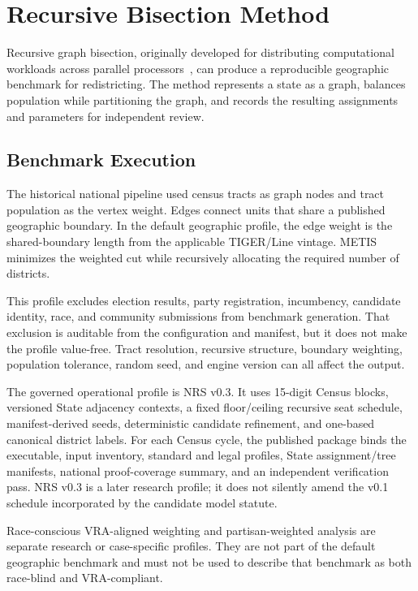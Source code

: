 \section{Recursive Bisection Method}

Recursive graph bisection, originally developed for distributing computational
workloads across parallel processors~\cite{karypis1998metis}, can produce a
reproducible geographic benchmark for redistricting. The method represents a
state as a graph, balances population while partitioning the graph, and records
the resulting assignments and parameters for independent review.

\subsection{Benchmark Execution}

The historical national pipeline used census tracts as graph nodes and tract
population as the vertex weight. Edges connect units that share a published
geographic boundary. In the default geographic profile, the edge weight is the
shared-boundary length from the applicable TIGER/Line vintage. METIS minimizes
the weighted cut while recursively allocating the required number of districts.

This profile excludes election results, party registration, incumbency,
candidate identity, race, and community submissions from benchmark
generation. That exclusion is auditable from the configuration and manifest,
but it does not make the profile value-free. Tract resolution, recursive
structure, boundary weighting, population tolerance, random seed, and engine
version can all affect the output.

The governed operational profile is NRS v0.3. It uses 15-digit Census blocks,
versioned State adjacency contexts, a fixed floor/ceiling recursive seat
schedule, manifest-derived seeds, deterministic candidate refinement, and
one-based canonical district labels. For each Census cycle, the published
package binds the executable, input inventory, standard and legal profiles,
State assignment/tree manifests, national proof-coverage summary, and an
independent verification pass. NRS v0.3 is a later research profile; it does
not silently amend the v0.1 schedule incorporated by the candidate model
statute.

Race-conscious VRA-aligned weighting and partisan-weighted analysis are
separate research or case-specific profiles. They are not part of the default
geographic benchmark and must not be used to describe that benchmark as both
race-blind and VRA-compliant.

